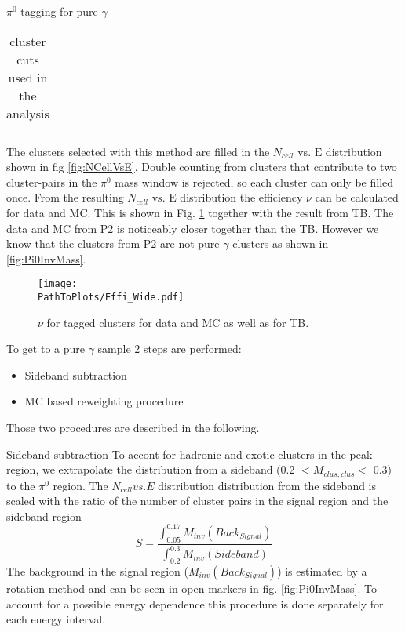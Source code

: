 \documentclass[ALICE]{ALICE_analysis_notes}
\newcommand{\PZ}{$\pi^0$\xspace}
\newcommand{\g}{$\gamma$\xspace}
\newcommand{\PathToPlots}{/home/joshua/PCG_Software/EMCal_NCellEffi/13TeVNomB_Wide/Pi0Tagging_13TeV_nom_04_26_WithTRD_WithBorderCells_1cellFT/pdf}
\begin{document}
\begin{section}{\PZ tagging for pure \g}
\begin{table}[ht!]
\begin{tabular}{ c c }
	\end{tabular}	
	
	\caption{ cluster cuts used in the analysis }
	\label{Tab:ClusCuts} 
\end{table}



The clusters selected with this method are filled in the $N_{cell}\text{ vs. E}$ distribution shown in fig \ref{fig:NCellVsE}. Double counting from clusters that contribute to two cluster-pairs in the \PZ mass window is rejected, so each cluster can only be filled once. From the resulting $N_{cell}\text{ vs. E}$ distribution the efficiency $\nu$ can be calculated for data and MC. This is shown in Fig. \ref{fig:NCellEff_Tagging1} together with the result from TB. The data and MC from P2 is noticeably closer together than the TB. However we know that the clusters from P2 are not pure \g clusters as shown in \ref{fig:Pi0InvMass}.\\
\begin{figure}[ht!]
	\centering
	\texttt{[image: \\PathToPlots/Effi\_Wide.pdf]}	
	
	\caption{  $\nu$ for tagged clusters for data and MC as well as for TB.}
	\label{fig:NCellEff_Tagging1}
\end{figure}


To get to a pure \g sample 2 steps are performed:
\begin{itemize}
	\item Sideband subtraction
	\item MC based reweighting procedure
\end{itemize}
Those two procedures are described in the following.
\begin{subsection}{Sideband subtraction}
	To accont for hadronic and exotic clusters in the peak region, we extrapolate the distribution from a sideband (0.2 $< M_{clus, clus} <$ 0.3) to the \PZ region. 
	The $N_{cell} vs. E$  distribution distribution from the sideband is scaled with the ratio of the number of cluster pairs in the signal region and the sideband region 
	\begin{equation}
	S = \frac{\int_{0.05}^{0.17} M_{inv}(Back_{Signal})}{\int_{0.2}^{0.3} M_{inv}(Sideband)}
	\end{equation}
	The background in the signal region ($M_{inv}(Back_{Signal})$) is estimated by a rotation method and can be seen in open markers in fig. \ref{fig:Pi0InvMass}. To account for a possible energy dependence this procedure is done separately for each energy interval.
\end{subsection}


\end{section}
\end{document}
